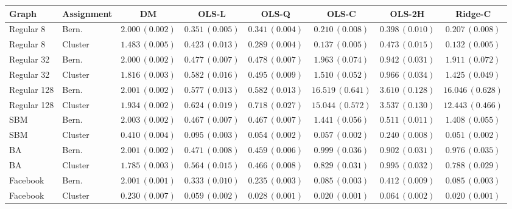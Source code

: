 \begin{tabular}{llcccccc}
\toprule
Graph & Assignment & DM & OLS-L & OLS-Q & OLS-C & OLS-2H & Ridge-C \\
\midrule
Regular 8 & Bern. & $2.000\,(0.002)$ & $0.351\,(0.005)$ & $0.341\,(0.004)$ & $0.210\,(0.008)$ & $0.398\,(0.010)$ & $0.207\,(0.008)$ \\
Regular 8 & Cluster & $1.483\,(0.005)$ & $0.423\,(0.013)$ & $0.289\,(0.004)$ & $0.137\,(0.005)$ & $0.473\,(0.015)$ & $0.132\,(0.005)$ \\
Regular 32 & Bern. & $2.000\,(0.002)$ & $0.477\,(0.007)$ & $0.478\,(0.007)$ & $1.963\,(0.074)$ & $0.942\,(0.031)$ & $1.911\,(0.072)$ \\
Regular 32 & Cluster & $1.816\,(0.003)$ & $0.582\,(0.016)$ & $0.495\,(0.009)$ & $1.510\,(0.052)$ & $0.966\,(0.034)$ & $1.425\,(0.049)$ \\
Regular 128 & Bern. & $2.001\,(0.002)$ & $0.577\,(0.013)$ & $0.582\,(0.013)$ & $16.519\,(0.641)$ & $3.610\,(0.128)$ & $16.046\,(0.628)$ \\
Regular 128 & Cluster & $1.934\,(0.002)$ & $0.624\,(0.019)$ & $0.718\,(0.027)$ & $15.044\,(0.572)$ & $3.537\,(0.130)$ & $12.443\,(0.466)$ \\
SBM & Bern. & $2.003\,(0.002)$ & $0.467\,(0.007)$ & $0.467\,(0.007)$ & $1.441\,(0.056)$ & $0.511\,(0.011)$ & $1.408\,(0.055)$ \\
SBM & Cluster & $0.410\,(0.004)$ & $0.095\,(0.003)$ & $0.054\,(0.002)$ & $0.057\,(0.002)$ & $0.240\,(0.008)$ & $0.051\,(0.002)$ \\
BA & Bern. & $2.001\,(0.002)$ & $0.471\,(0.008)$ & $0.459\,(0.006)$ & $0.999\,(0.036)$ & $0.902\,(0.031)$ & $0.976\,(0.035)$ \\
BA & Cluster & $1.785\,(0.003)$ & $0.564\,(0.015)$ & $0.466\,(0.008)$ & $0.829\,(0.031)$ & $0.995\,(0.032)$ & $0.788\,(0.029)$ \\
Facebook & Bern. & $2.001\,(0.001)$ & $0.333\,(0.010)$ & $0.235\,(0.003)$ & $0.085\,(0.003)$ & $0.412\,(0.009)$ & $0.085\,(0.003)$ \\
Facebook & Cluster & $0.230\,(0.007)$ & $0.059\,(0.002)$ & $0.028\,(0.001)$ & $0.020\,(0.001)$ & $0.064\,(0.002)$ & $0.020\,(0.001)$ \\
\bottomrule
\end{tabular}